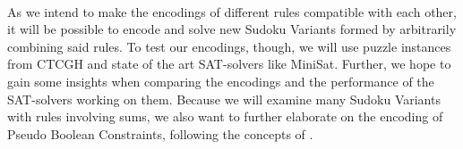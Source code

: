 \\
As we intend to make the encodings of different rules compatible with each other, it will be possible to encode and solve new Sudoku Variants formed by arbitrarily combining said rules. To test our encodings, though, we will use puzzle instances from CTCGH and state of the art SAT-solvers like MiniSat. Further, we hope to gain some insights when comparing the encodings and the performance of the SAT-solvers working on them. Because we will examine many Sudoku Variants with rules involving sums, we also want to further elaborate on the encoding of Pseudo Boolean Constraints, following the concepts of \cite{Een2006TranslatingPC}.






